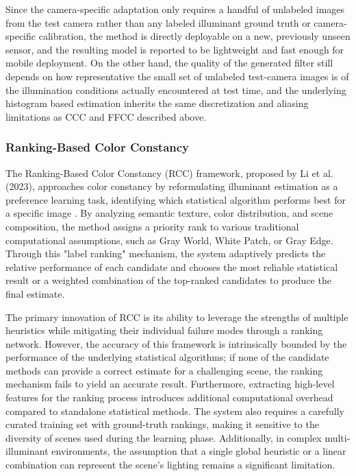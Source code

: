 Since the camera-specific adaptation only requires a handful of unlabeled images from the test camera rather than any labeled illuminant ground truth or camera-specific calibration, the method is directly deployable on a new, previously unseen sensor, and the resulting model is reported to be lightweight and fast enough for mobile deployment. On the other hand, the quality of the generated filter still depends on how representative the small set of unlabeled test-camera images is of the illumination conditions actually encountered at test time, and the underlying histogram based estimation inherits the same discretization and aliasing limitations as CCC and FFCC described above.

\subsubsection{Ranking-Based Color Constancy}
The Ranking-Based Color Constancy (RCC) framework, proposed by Li et al. (2023), approaches color constancy by reformulating illuminant estimation as a preference learning task, identifying which statistical algorithm performs best for a specific image \cite{ranking_based_color_constancy}. By analyzing semantic texture, color distribution, and scene composition, the method assigns a priority rank to various traditional computational assumptions, such as Gray World, White Patch, or Gray Edge. Through this "label ranking" mechanism, the system adaptively predicts the relative performance of each candidate and chooses the most reliable statistical result or a weighted combination of the top-ranked candidates to produce the final estimate.

The primary innovation of RCC is its ability to leverage the strengths of multiple heuristics while mitigating their individual failure modes through a ranking network. However, the accuracy of this framework is intrinsically bounded by the performance of the underlying statistical algorithms; if none of the candidate methods can provide a correct estimate for a challenging scene, the ranking mechanism fails to yield an accurate result. Furthermore, extracting high-level features for the ranking process introduces additional computational overhead compared to standalone statistical methods. The system also requires a carefully curated training set with ground-truth rankings, making it sensitive to the diversity of scenes used during the learning phase. Additionally, in complex multi-illuminant environments, the assumption that a single global heuristic or a linear combination can represent the scene's lighting remains a significant limitation.

